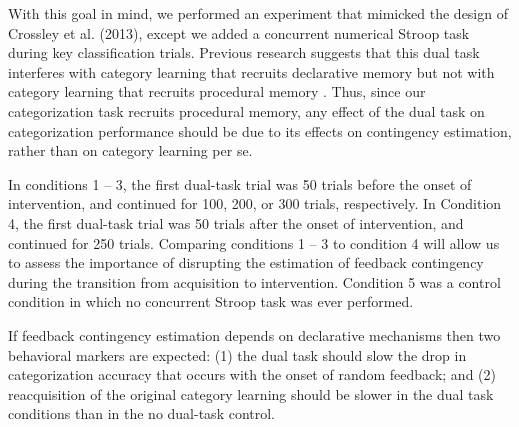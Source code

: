 With this goal in mind, we performed an experiment that mimicked the design of Crossley et al. (2013), except we added a concurrent numerical Stroop task during key classification trials. Previous research suggests that this dual task interferes with category learning that recruits declarative memory but not with category learning that recruits procedural memory \cite{WaldronAshby2001}. Thus, since our categorization task recruits procedural memory, any effect of the dual task on categorization performance should be due to its effects on contingency estimation, rather than on category learning per se.

In conditions 1 -- 3, the first dual-task trial was 50 trials before the onset of intervention, and continued for 100, 200, or 300 trials, respectively. In Condition 4, the first dual-task trial was 50 trials after the onset of intervention, and continued for 250 trials.
Comparing conditions 1 -- 3 to condition 4 will allow us to assess the
importance of disrupting the estimation of feedback contingency during the 
transition from acquisition to intervention. Condition 5 was a control condition
in which no concurrent Stroop task was ever performed. 

If feedback contingency estimation depends on declarative mechanisms then
two behavioral markers are expected: (1) the dual task should slow the drop in categorization accuracy that occurs with the onset of random feedback; and (2) reacquisition of the original category learning should be slower in the dual task conditions than in the no dual-task control.
